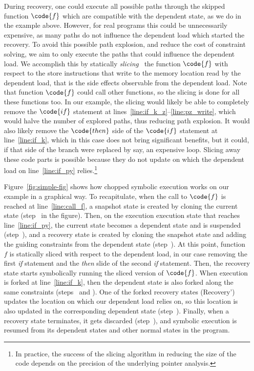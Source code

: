 During recovery, one could execute all possible paths through the
skipped function $\code{f}$ which are compatible with the dependent
state, as we do in the example above. However, for real programs this
could be unnecessarily expensive, as many paths do not influence the
dependent load which started the recovery. To avoid this possible path
explosion, and reduce the cost of constraint solving, we aim to only
execute the paths that could influence the dependent load. We
accomplish this by statically \emph{slicing}~\cite{Weiser:ICSE1981,
  Tip95asurvey, BinkleyH04, Xu:Slicing2005} the function $\code{f}$
with respect to the store instructions that write to the memory
location read by the dependent load, that is the side effects
observable from the dependent load. Note that function $\code{f}$
could call other functions, so the slicing is done for all these
functions too. In our example, the slicing would likely be able to
completely remove the $\code{if}$ statement at
lines~\ref{line:if_k_z}--\ref{line:pz_write}, which would halve the
number of explored paths, thus reducing path explosion. It would also
likely remove the $\code{then}$ side of the $\code{if}$ statement at
line~\ref{line:if_k}, which in this case does not bring significant
benefits, but it could, if that side of the branch were replaced by
say, an expensive loop. Slicing away these code parts is possible
because they do not update  on which the dependent load on
line~\ref{line:if_py} relies.\footnote{In practice, the success of the
  slicing algorithm in reducing the size of the code depends on the
  precision of the underlying pointer analysis.}

Figure~\ref{fig:simple-fig} shows how chopped symbolic execution works
on our example in a graphical way. To recapitulate, when the call to
$\code{f}$ is reached at line~\ref{line:call_f}, a snapshot state is
created by cloning the current state (step~ in the figure).
Then, on the execution execution state that reaches
line~\ref{line:if_py}, the current state becomes a dependent state and
is suspended (step~), and a recovery state is created by
cloning the snapshot state and adding the guiding constraints from the
dependent state (step~). At this point, function $f$ is
statically sliced with respect to the dependent load, in our case
removing the first \textit{if} statement and the \textit{then} slide
of the second \textit{if} statement. Then, the recovery state starts
symbolically running the sliced version of $\code{f}$.  When execution
is forked at line~\ref{line:if_k}, then the dependent state is also
forked along the same constraints (steps~ and ). One
of the forked recovery states (Recovery') updates the location
 on which our dependent load relies on, so this location is
also updated in the corresponding dependent state
(step~). Finally, when a recovery state terminates,
it gets discarded  (step~), and
symbolic execution is resumed from its dependent states  and other
normal states in the program.

